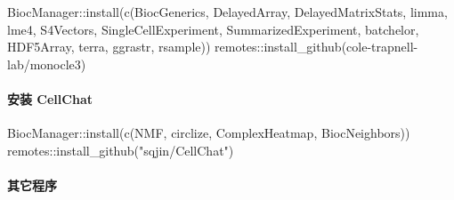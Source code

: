 \documentclass[
]{article}
\newenvironment{Shaded}{\begin{snugshade}}{\end{snugshade}}
\newcommand{\FunctionTok}[1]{\textcolor[rgb]{0.00,0.00,0.00}{#1}}
\newcommand{\NormalTok}[1]{#1}
\newcommand{\SpecialCharTok}[1]{\textcolor[rgb]{0.00,0.00,0.00}{#1}}
\newcommand{\StringTok}[1]{\textcolor[rgb]{0.31,0.60,0.02}{#1}}
\begin{document}
\begin{Shaded}
\begin{Highlighting}[]
\NormalTok{BiocManager}\SpecialCharTok{::}\FunctionTok{install}\NormalTok{(}\FunctionTok{c}\NormalTok{(}\StringTok{\textquotesingle{}BiocGenerics\textquotesingle{}}\NormalTok{, }\StringTok{\textquotesingle{}DelayedArray\textquotesingle{}}\NormalTok{, }\StringTok{\textquotesingle{}DelayedMatrixStats\textquotesingle{}}\NormalTok{,}
    \StringTok{\textquotesingle{}limma\textquotesingle{}}\NormalTok{, }\StringTok{\textquotesingle{}lme4\textquotesingle{}}\NormalTok{, }\StringTok{\textquotesingle{}S4Vectors\textquotesingle{}}\NormalTok{, }\StringTok{\textquotesingle{}SingleCellExperiment\textquotesingle{}}\NormalTok{,}
    \StringTok{\textquotesingle{}SummarizedExperiment\textquotesingle{}}\NormalTok{, }\StringTok{\textquotesingle{}batchelor\textquotesingle{}}\NormalTok{, }\StringTok{\textquotesingle{}HDF5Array\textquotesingle{}}\NormalTok{,}
    \StringTok{\textquotesingle{}terra\textquotesingle{}}\NormalTok{, }\StringTok{\textquotesingle{}ggrastr\textquotesingle{}}\NormalTok{, }\StringTok{\textquotesingle{}rsample\textquotesingle{}}\NormalTok{))}
\NormalTok{remotes}\SpecialCharTok{::}\FunctionTok{install\_github}\NormalTok{(}\StringTok{\textquotesingle{}cole{-}trapnell{-}lab/monocle3\textquotesingle{}}\NormalTok{)}
\end{Highlighting}
\end{Shaded}

\hypertarget{ux5b89ux88c5-cellchat}{%
\paragraph{安装 CellChat}\label{ux5b89ux88c5-cellchat}}

\begin{Shaded}
\begin{Highlighting}[]
\NormalTok{BiocManager}\SpecialCharTok{::}\FunctionTok{install}\NormalTok{(}\FunctionTok{c}\NormalTok{(}\StringTok{\textquotesingle{}NMF\textquotesingle{}}\NormalTok{, }\StringTok{\textquotesingle{}circlize\textquotesingle{}}\NormalTok{, }\StringTok{\textquotesingle{}ComplexHeatmap\textquotesingle{}}\NormalTok{, }\StringTok{\textquotesingle{}BiocNeighbors\textquotesingle{}}\NormalTok{))}
\NormalTok{remotes}\SpecialCharTok{::}\FunctionTok{install\_github}\NormalTok{(}\StringTok{"sqjin/CellChat"}\NormalTok{)}
\end{Highlighting}
\end{Shaded}

\hypertarget{ux5176ux5b83ux7a0bux5e8f}{%
\paragraph{其它程序}\label{ux5176ux5b83ux7a0bux5e8f}}
\end{document}

